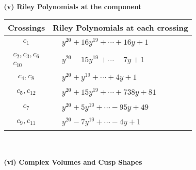 \documentclass[1p]{elsarticle_modified}
\theoremstyle{definition}
\begin{document}
\newpage\renewcommand{\arraystretch}{1}
\flushleft \textbf{(v) Riley Polynomials at the component}\newline \\
\begin{tabular}{m{50pt}|m{274pt}}
Crossings & \hspace{64pt}Riley Polynomials at each crossing \\
\hline $$\begin{aligned}c_{1}\end{aligned}$$&$\begin{aligned}
&y^{20}+16 y^{19}+\cdots+16 y+1
\end{aligned}$\\
\hline $$\begin{aligned}c_{2},c_{3},c_{6}\\c_{10}\end{aligned}$$&$\begin{aligned}
&y^{20}-15 y^{19}+\cdots-7 y+1
\end{aligned}$\\
\hline $$\begin{aligned}c_{4},c_{8}\end{aligned}$$&$\begin{aligned}
&y^{20}+y^{19}+\cdots+4 y+1
\end{aligned}$\\
\hline $$\begin{aligned}c_{5},c_{12}\end{aligned}$$&$\begin{aligned}
&y^{20}+15 y^{19}+\cdots+738 y+81
\end{aligned}$\\
\hline $$\begin{aligned}c_{7}\end{aligned}$$&$\begin{aligned}
&y^{20}+5 y^{19}+\cdots-95 y+49
\end{aligned}$\\
\hline $$\begin{aligned}c_{9},c_{11}\end{aligned}$$&$\begin{aligned}
&y^{20}-7 y^{19}+\cdots-4 y+1
\end{aligned}$\\
\hline
\end{tabular}\\~\\
\newpage\flushleft \textbf{(vi) Complex Volumes and Cusp Shapes}
\end{document}
